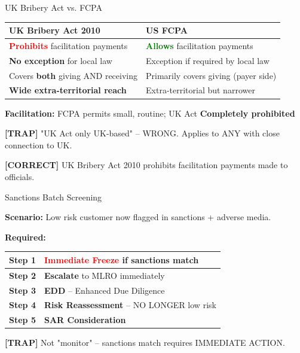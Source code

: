 \documentclass[8pt,aspectratio=169,fontsize=7pt]{beamer}
\renewcommand{\tiny}{\fontsize{4pt}{5pt}\selectfont}
\renewcommand{\normalsize}{\fontsize{8pt}{9pt}\selectfont}
\newcommand{\trap}[1]{%
	\begin{block}{\textcolor{redtrap}{\textbf{[TRAP]}}}
		\textcolor{redtrap}{\tiny #1}
	\end{block}
}
\newcommand{\correct}[1]{%
	\begin{block}{\textcolor{greencorrect}{\textbf{[CORRECT]}}}
		\textcolor{greencorrect}{\tiny #1}
	\end{block}
}
\begin{document}
	\begin{frame}{\normalsize UK Bribery Act vs. FCPA}
		
		\begin{table}
			\begin{tabular}{|p{4.2cm}|p{4.2cm}|}
				\hline
				\textbf{UK Bribery Act 2010} & \textbf{US FCPA} \\
				\hline
				\textcolor{red}{\textbf{Prohibits}} facilitation payments & \textcolor{green}{\textbf{Allows}} facilitation payments \\
				\hline
				\textbf{No exception} for local law & Exception if required by local law \\
				\hline
				Covers \textbf{both} giving AND receiving & Primarily covers giving (payer side) \\
				\hline
				\textbf{Wide extra-territorial reach} & Extra-territorial but narrower \\
				\hline
			\end{tabular}
		\end{table}
		
		\textbf{Facilitation:} FCPA permits small, routine; UK Act \textbf{Completely prohibited}
		
		\trap{"UK Act only UK-based" -- WRONG. Applies to ANY with close connection to UK.}
		
		\correct{UK Bribery Act 2010 prohibits facilitation payments made to officials.}
	\end{frame}
	
	\begin{frame}{\normalsize Sanctions Batch Screening}
		
		\textbf{Scenario:} Low risk customer now flagged in sanctions + adverse media.
		
		\textbf{Required:}
		\begin{table}
			\begin{tabular}{|p{2cm}|p{5.8cm}|}
				\hline
				\textbf{Step 1} & \textcolor{red}{\textbf{Immediate Freeze}} if sanctions match \\
				\hline
				\textbf{Step 2} & \textbf{Escalate} to MLRO immediately \\
				\hline
				\textbf{Step 3} & \textbf{EDD} -- Enhanced Due Diligence \\
				\hline
				\textbf{Step 4} & \textbf{Risk Reassessment} -- NO LONGER low risk \\
				\hline
				\textbf{Step 5} & \textbf{SAR Consideration} \\
				\hline
			\end{tabular}
		\end{table}
		
		\trap{Not "monitor" -- sanctions match requires IMMEDIATE ACTION.}
	\end{frame}
	
\end{document}
